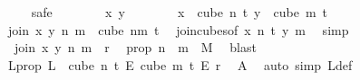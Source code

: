 \begin{isabellebody}
\ \ \ \ \isamarkupfalse%
{\isacharparenleft}{\kern0pt}safe{\isacharparenright}{\kern0pt}\isanewline
\ \ \ \ \ \ \isamarkupfalse%
\ x\ y\isanewline
\ \ \ \ \ \ \isamarkupfalse%
\ {\isachardoublequoteopen}x\ {\isasymin}\ cube\ n\ {\isacharparenleft}{\kern0pt}t{\isacharplus}{\kern0pt}{}{\isacharparenright}{\kern0pt}{\isachardoublequoteclose}\ {\isachardoublequoteopen}y\ {\isasymin}\ cube\ m\ {\isacharparenleft}{\kern0pt}t{\isacharplus}{\kern0pt}{}{\isacharparenright}{\kern0pt}{\isachardoublequoteclose}\isanewline
\ \ \ \ \ \ \isamarkupfalse%
\ \isamarkupfalse%
\ {\isachardoublequoteopen}join\ x\ y\ n\ m\ {\isasymin}\ cube\ {\isacharparenleft}{\kern0pt}n{\isacharplus}{\kern0pt}m{\isacharparenright}{\kern0pt}\ {\isacharparenleft}{\kern0pt}t{\isacharplus}{\kern0pt}{}{\isacharparenright}{\kern0pt}{\isachardoublequoteclose}\ \isamarkupfalse%
\ join{\isacharunderscore}{\kern0pt}cubes{\isacharbrackleft}{\kern0pt}of\ x\ n\ t\ y\ m{\isacharbrackright}{\kern0pt}\ \isamarkupfalse%
\ simp\isanewline
\ \ \ \ \ \ \isamarkupfalse%
\ \isamarkupfalse%
\ {\isachardoublequoteopen}{\isasymchi}\ {\isacharparenleft}{\kern0pt}join\ x\ y\ n\ m{\isacharparenright}{\kern0pt}\ {\isacharless}{\kern0pt}\ r{\isachardoublequoteclose}\ \isamarkupfalse%
\ {\isasymchi}{\isacharunderscore}{\kern0pt}prop\ {\isacartoucheopen}n\ {\isacharplus}{\kern0pt}\ m\ {\isacharequal}{\kern0pt}\ M{\isacharprime}{\kern0pt}{\isacartoucheclose}\ \isamarkupfalse%
\ blast\ \isanewline
\ \ \ \ \isamarkupfalse%
\isanewline
\ \ \ \ \isamarkupfalse%
\ {\isasymchi}L{\isacharunderscore}{\kern0pt}prop{\isacharcolon}{\kern0pt}\ {\isachardoublequoteopen}{\isasymchi}L\ {\isasymin}\ cube\ n\ {\isacharparenleft}{\kern0pt}t{\isacharplus}{\kern0pt}{}{\isacharparenright}{\kern0pt}\ {\isasymrightarrow}\isactrlsub E\ cube\ m\ {\isacharparenleft}{\kern0pt}t{\isacharplus}{\kern0pt}{}{\isacharparenright}{\kern0pt}\ {\isasymrightarrow}\isactrlsub E\ {\isacharbraceleft}{\kern0pt}{\isachardot}{\kern0pt}{\isachardot}{\kern0pt}{\isacharless}{\kern0pt}r{\isacharbraceright}{\kern0pt}{\isachardoublequoteclose}\ \isamarkupfalse%
\ A\ \isamarkupfalse%
\ {\isacharparenleft}{\kern0pt}auto\ simp{\isacharcolon}{\kern0pt}\ {\isasymchi}L{\isacharunderscore}{\kern0pt}def{\isacharparenright}{\kern0pt}\isanewline
\isanewline
\ \ \ \ \isamarkupfalse%

\end{isabellebody}

